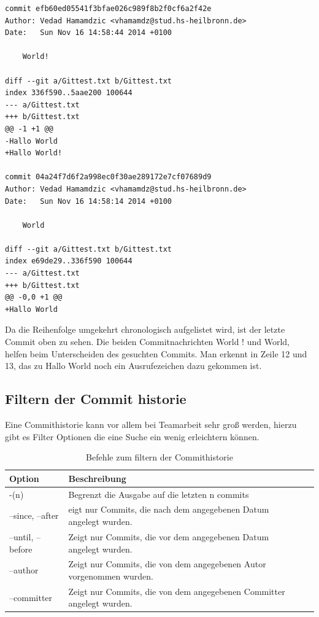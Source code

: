 \documentclass[12pt,a4paper,bibliography=totocnumbered,listof=totocnumbered]{scrartcl}
\begin{document}
\vspace{1em}
\begin{lstlisting}[caption=Git log Unterschiede der letzten 2 Commits, label=lst:arduino]
commit efb60ed05541f3bfae026c989f8b2f0cf6a2f42e
Author: Vedad Hamamdzic <vhamamdz@stud.hs-heilbronn.de>
Date:   Sun Nov 16 14:58:44 2014 +0100

    World!

diff --git a/Gittest.txt b/Gittest.txt
index 336f590..5aae200 100644
--- a/Gittest.txt
+++ b/Gittest.txt
@@ -1 +1 @@
-Hallo World
+Hallo World!

commit 04a24f7d6f2a998ec0f30ae289172e7cf07689d9
Author: Vedad Hamamdzic <vhamamdz@stud.hs-heilbronn.de>
Date:   Sun Nov 16 14:58:14 2014 +0100

    World

diff --git a/Gittest.txt b/Gittest.txt
index e69de29..336f590 100644
--- a/Gittest.txt
+++ b/Gittest.txt
@@ -0,0 +1 @@
+Hallo World
\end{lstlisting}
Da die Reihenfolge umgekehrt chronologisch aufgelistet wird, ist der letzte Commit oben zu sehen. Die beiden Commitnachrichten World ! und World, helfen beim Unterscheiden des gesuchten Commits. Man erkennt in Zeile 12 und 13, das zu Hallo World noch ein Ausrufezeichen dazu gekommen ist.
\newpage


\subsection{Filtern der Commit historie}
Eine Commithistorie kann vor allem bei Teamarbeit sehr groß werden, hierzu gibt es Filter Optionen die eine Suche ein wenig erleichtern können. 
 \vspace{1em}
\begin{table}[!h]
	\centering
	\begin{tabular}{|l|l|l|}
		\hline
		\textbf{Option} & \textbf{Beschreibung} \\
		\hline
		-(n)& Begrenzt die Ausgabe auf die letzten n commits\\
		\hline
		--since, --after & eigt nur Commits, die nach dem angegebenen Datum angelegt wurden.\\
		\hline
		--until, --before & Zeigt nur Commits, die vor dem angegebenen Datum angelegt wurden.\\
		\hline
		--author & Zeigt nur Commits, die von dem angegebenen Autor vorgenommen wurden.\\
		\hline
		--committer & Zeigt nur Commits, die von dem angegebenen Committer angelegt wurden.\\
		\hline
	\end{tabular}
	\caption{Befehle zum filtern der Commithistorie}
	\label{tab:Befehle}
\end{table}
\end{document}
